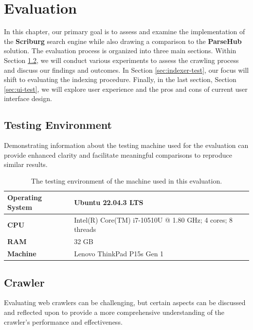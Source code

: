 \chapter{Evaluation}
\label{chap:evaluation}
In this chapter, our primary goal is to assess and examine the implementation of the \textbf{Scriburg} search engine while also drawing a comparison to the \textbf{ParseHub} solution. The evaluation process is organized into three main sections. Within Section \ref{sec:crawler-test}, we will conduct various experiments to assess the crawling process and discuss our findings and outcomes. In Section \ref{sec:indexer-test}, our focus will shift to evaluating the indexing procedure. Finally, in the last section, Section \ref{sec:ui-test}, we will explore user experience and the pros and cons of current user interface design.

\section{Testing Environment}
Demonstrating information about the testing machine used for the evaluation can provide enhanced clarity and facilitate meaningful comparisons to reproduce similar results.


\begin{table}[ht] 
\centering
{\footnotesize
\begin{tabular}{|P{3cm}|P{9.9cm}|}
 \hline
\textbf{Operating System} & Ubuntu 22.04.3 LTS \\ \hline
\textbf{CPU} & Intel(R) Core(TM) i7-10510U @ 1.80 GHz; 4 cores; 8 threads\\ \hline
\textbf{RAM} & 32 GB\\ \hline
\textbf{Machine} & Lenovo ThinkPad P15s Gen 1\\ 
\hline
    \end{tabular}
}
  \captionsetup{justification=centering,margin=2cm}
  \caption{The testing environment of the machine used in this evaluation.}
\end{table}

\section{Crawler}\label{sec:crawler-test}

Evaluating web crawlers can be challenging, but certain aspects can be discussed and reflected upon to provide a more comprehensive understanding of the crawler's performance and effectiveness.

